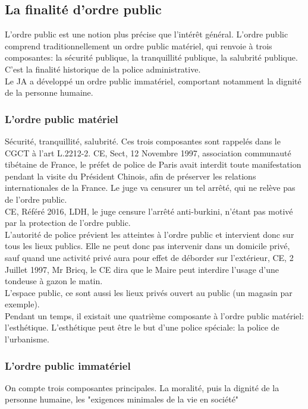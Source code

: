 \documentclass[10pt, a4paper, openany]{book}
\begin{document}
\subsection{La finalité d'ordre public}

L'ordre public est une notion plus précise que l'intérêt général. L'ordre public comprend traditionnellement un ordre public matériel, qui renvoie à trois composantes: la sécurité publique, la tranquillité publique, la salubrité publique. C'est la finalité historique de la police administrative. \\
Le JA a développé un ordre public immatériel, comportant notamment la dignité de la personne humaine. 

\subsubsection{L'ordre public matériel}

Sécurité, tranquillité, salubrité. Ces trois composantes sont rappelés dans le CGCT à l'art L.2212-2. CE, Sect, 12 Novembre 1997, association communauté tibétaine de France, le préfet de police de Paris avait interdit toute manifestation pendant la visite du Président Chinois, afin de préserver les relations internationales de la France. Le juge va censurer un tel arrêté, qui ne relève pas de l'ordre public. \\
CE, Référé 2016, LDH, le juge censure l'arrêté anti-burkini, n'étant pas motivé par la protection de l'ordre public. \\
L'autorité de police prévient les atteintes à l'ordre public et intervient donc sur tous les lieux publics. Elle ne peut donc pas intervenir dans un domicile privé, sauf quand une activité privé aura pour effet de déborder sur l'extérieur, CE, 2 Juillet 1997, Mr Bricq, le CE dira que le Maire peut interdire l'usage d'une tondeuse à gazon le matin. \\
L'espace public, ce sont aussi les lieux privés ouvert au public (un magasin par exemple). \\
Pendant un temps, il existait une quatrième composante à l'ordre public matériel: l'esthétique. L'esthétique peut être le but d'une police spéciale: la police de l'urbanisme. 

\subsubsection{L'ordre public immatériel}

On compte trois composantes principales. La moralité, puis la dignité de la personne humaine, les "exigences minimales de la vie en société"
\end{document}
